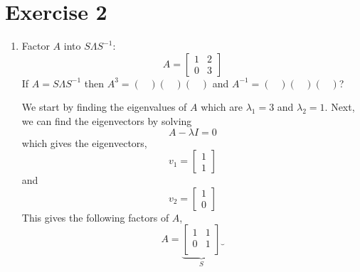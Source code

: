 \section{Exercise 2}
\begin{enumerate}[label=\arabic*.]
    \item Factor $A$ into $S \Lambda S^{-1}$:
        \begin{equation}
            A = 
            \begin{bmatrix}
                1 & 2 \\
                0 & 3
            \end{bmatrix}
        \end{equation}
    If $A=S \Lambda S^{-1}$ then $A^{3} = (\;\;\;)(\;\;\;)(\;\;\;)$ and
        $A^{-1} = (\;\;\;)(\;\;\;)(\;\;\;)$?
        \begin{mdframed}[style=MyFrame]
            We start by finding the eigenvalues of $A$ which are
            $\lambda_{1} =  3$ and $\lambda_{2}=1$. Next, we can find the
            eigenvectors by solving
            \begin{equation}
                A - \lambda I = 0 
            \end{equation}
            which gives the eigenvectors,
            \begin{equation}
                v_{1} = 
                \begin{bmatrix}
                    1   \\
                    1
                \end{bmatrix}
            \end{equation}
            and
            \begin{equation}
                v_{2}  =
                \begin{bmatrix}
                    1   \\
                    0
                \end{bmatrix}
            \end{equation}
            This gives the following factors of $A$,
            \begin{equation}
                A = 
                \underbrace{
                \begin{bmatrix}
                    1       &   1   \\
                    0       &   1   \\
                \end{bmatrix}
                }_{S}
                \underbrace{
}
\end{equation}
\end{mdframed}
\end{enumerate}
